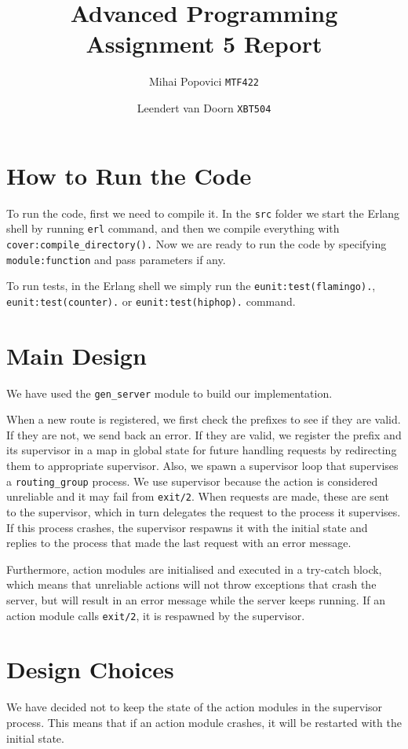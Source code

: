 \documentclass{article}
\title{Advanced Programming Assignment 5 Report}
\author{Mihai Popovici \texttt{MTF422} \and Leendert van Doorn \texttt{XBT504}}
\begin{document}
	
	\maketitle	
	
	\section{How to Run the Code}
	To run the code, first we need to compile it. In the \texttt{src} folder we start the Erlang shell by running \texttt{erl} command, and then we compile everything with \texttt{cover:compile\_directory().}
	Now we are ready to run the code by specifying \texttt{module:function} and pass parameters if any.
	
	To run tests, in the Erlang shell we simply run the \texttt{eunit:test(flamingo).}, \texttt{eunit:test(counter).} or \texttt{eunit:test(hiphop).} command.
	
	\section{Main Design}
	We have used the \texttt{gen\_server} module to build our implementation. 
	
	When a new route is registered, we first check the prefixes to see if they are valid. If they are not, we send back an error. If they are valid, we register the prefix and its supervisor in a map in global state for future handling requests by redirecting them to appropriate supervisor. Also, we spawn a supervisor loop that supervises a \texttt{routing\_group} process. We use supervisor because the action is considered unreliable and it may fail from \texttt{exit/2}. When requests are made, these are sent to the supervisor, which in turn delegates the request to the process it supervises. If this process crashes, the supervisor respawns it with the initial state and replies to the process that made the last request with an error message.
	
	Furthermore, action modules are initialised and executed in a try-catch block, which means that unreliable actions will not throw exceptions that crash the server, but will result in an error message while the server keeps running. If an action module calls \texttt{exit/2}, it is respawned by the supervisor.
	
	\section{Design Choices}
	We have decided not to keep the state of the action modules in the supervisor process. This means that if an action module crashes, it will be restarted with the initial state.
	
\end{document}
